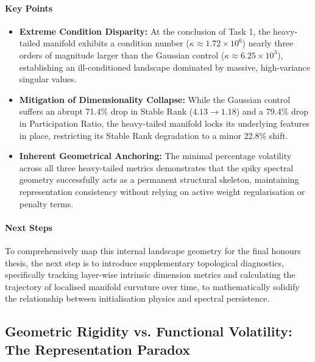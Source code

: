 \documentclass[10pt,a4paper]{article}
\begin{document}
	\paragraph{Key Points}
	\begin{itemize}
		\item \textbf{Extreme Condition Disparity:} At the conclusion of Task 1, the heavy-tailed manifold exhibits a condition number ($\kappa \approx 1.72 \times 10^6$) nearly three orders of magnitude larger than the Gaussian control ($\kappa \approx 6.25 \times 10^3$), establishing an ill-conditioned landscape dominated by massive, high-variance singular values.
		\item \textbf{Mitigation of Dimensionality Collapse:} While the Gaussian control suffers an abrupt 71.4\% drop in Stable Rank ($4.13 \rightarrow 1.18$) and a 79.4\% drop in Participation Ratio, the heavy-tailed manifold locks its underlying features in place, restricting its Stable Rank degradation to a minor 22.8\% shift.
		\item \textbf{Inherent Geometrical Anchoring:} The minimal percentage volatility across all three heavy-tailed metrics demonstrates that the spiky spectral geometry successfully acts as a permanent structural skeleton, maintaining representation consistency without relying on active weight regularisation or penalty terms.
	\end{itemize}
	
	\paragraph{Next Steps}
	To comprehensively map this internal landscape geometry for the final honours thesis, the next step is to introduce supplementary topological diagnostics, specifically tracking layer-wise intrinsic dimension metrics and calculating the trajectory of localised manifold curvature over time, to mathematically solidify the relationship between initialisation physics and spectral persistence.
	
	\newpage
	\subsection{Geometric Rigidity vs. Functional Volatility: The Representation Paradox}
	
\end{document}
